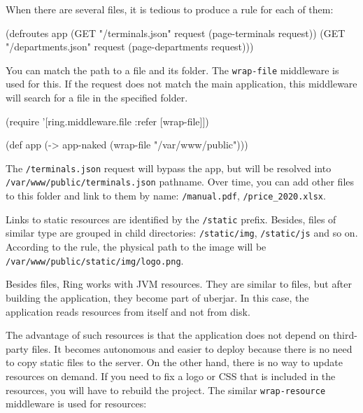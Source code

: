 When there are several files, it is tedious to produce a rule for each of them:

\begin{english}
\begin{clojure}
(defroutes app
(GET "/terminals.json"   request (page-terminals request))
(GET "/departments.json" request (page-departments request)))
\end{clojure}
\end{english}


You can match the path to a file and its folder. The \verb|wrap-file| middleware is used for this. If the request does not match the main application, this middleware will search for a file in the specified folder.

\begin{english}
\begin{clojure}
(require '[ring.middleware.file :refer [wrap-file]])

(def app (-> app-naked
(wrap-file "/var/www/public")))
\end{clojure}
\end{english}

The \verb|/terminals.json| request will bypass the app, but will be resolved into \verb|/var/www/public/terminals.json| pathname. Over time, you can add other files to this folder and link to them by name: \verb|/manual.pdf|, \verb|/price_2020.xlsx|.

Links to static resources are identified by the \verb|/static| prefix. Besides, files of similar type are grouped in child directories: \verb|/static/img|, \verb|/static/js| and so on. According to the rule, the physical path to the image will be \verb|/var/www/public/static/img/logo.png|.

Besides files, Ring works with JVM resources. They are similar to files, but after building the application, they become part of uberjar. In this case, the application reads resources from itself and not from disk.

The advantage of such resources is that the application does not depend on third-party files. It becomes autonomous and easier to deploy because there is no need to copy static files to the server. On the other hand, there is no way to update resources on demand. If you need to fix a logo or CSS that is included in the resources, you will have to rebuild the project. The similar \verb|wrap-resource| middleware is used for resources:

